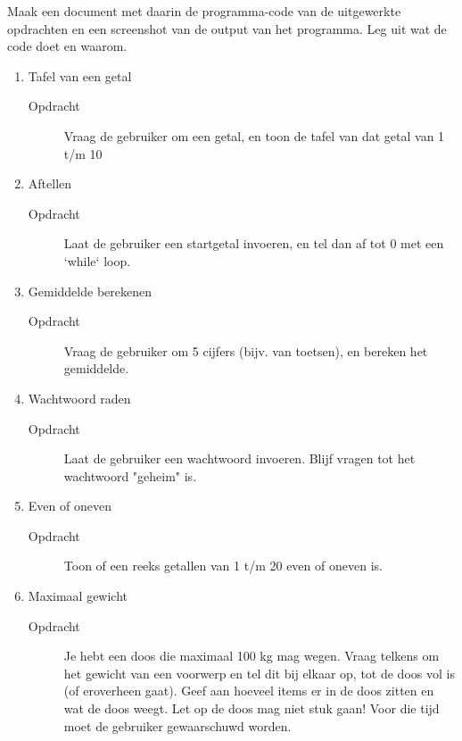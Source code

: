 Maak een document met daarin de programma-code van de uitgewerkte opdrachten en een screenshot van de output van het programma. Leg uit wat de code doet en waarom.

\begin{enumerate}
\item Tafel van een getal
	\begin{description}
	\item[Opdracht] Vraag de gebruiker om een getal, en toon de tafel van dat getal van 1 t/m 10
	\end{description}

\item Aftellen
	\begin{description}
	\item[Opdracht] Laat de gebruiker een startgetal invoeren, en tel dan af tot 0 met een `while` loop.
	\end{description}

\item Gemiddelde berekenen
	\begin{description}
	\item[Opdracht] Vraag de gebruiker om 5 cijfers (bijv. van toetsen), en bereken het gemiddelde.
	\end{description}

\item Wachtwoord raden
	\begin{description}
	\item[Opdracht] Laat de gebruiker een wachtwoord invoeren. Blijf vragen tot het wachtwoord "geheim" is.
	\end{description}

\item Even of oneven
	\begin{description}
	\item[Opdracht] Toon of een reeks getallen van 1 t/m 20 even of oneven is.
	\end{description}

\item Maximaal gewicht
	\begin{description}
	\item[Opdracht] Je hebt een doos die maximaal 100 kg mag wegen. Vraag telkens om het gewicht van een voorwerp en tel dit bij elkaar op, tot de doos vol is (of eroverheen gaat). Geef aan hoeveel items er in de doos zitten en wat de doos weegt. Let op de doos mag niet stuk gaan! Voor die tijd moet de gebruiker gewaarschuwd worden.
	\end{description}

\end{enumerate}
